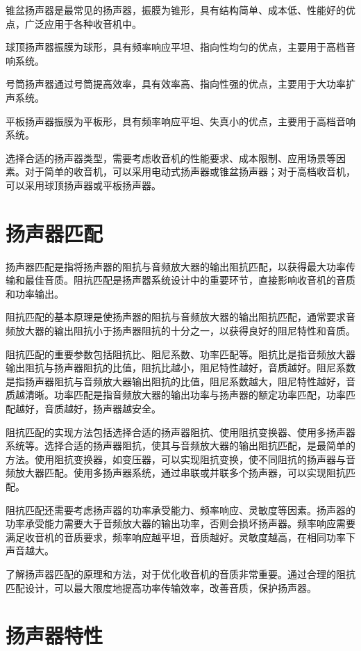 \documentclass[12pt,UTF8]{ctexbook}
\begin{document}
锥盆扬声器是最常见的扬声器，振膜为锥形，具有结构简单、成本低、性能好的优点，广泛应用于各种收音机中。

球顶扬声器振膜为球形，具有频率响应平坦、指向性均匀的优点，主要用于高档音响系统。

号筒扬声器通过号筒提高效率，具有效率高、指向性强的优点，主要用于大功率扩声系统。

平板扬声器振膜为平板形，具有频率响应平坦、失真小的优点，主要用于高档音响系统。

选择合适的扬声器类型，需要考虑收音机的性能要求、成本限制、应用场景等因素。对于简单的收音机，可以采用电动式扬声器或锥盆扬声器；对于高档收音机，可以采用球顶扬声器或平板扬声器。

\section{扬声器匹配}

扬声器匹配是指将扬声器的阻抗与音频放大器的输出阻抗匹配，以获得最大功率传输和最佳音质。阻抗匹配是扬声器系统设计中的重要环节，直接影响收音机的音质和功率输出。

阻抗匹配的基本原理是使扬声器的阻抗与音频放大器的输出阻抗匹配，通常要求音频放大器的输出阻抗小于扬声器阻抗的十分之一，以获得良好的阻尼特性和音质。

阻抗匹配的重要参数包括阻抗比、阻尼系数、功率匹配等。阻抗比是指音频放大器输出阻抗与扬声器阻抗的比值，阻抗比越小，阻尼特性越好，音质越好。阻尼系数是指扬声器阻抗与音频放大器输出阻抗的比值，阻尼系数越大，阻尼特性越好，音质越清晰。功率匹配是指音频放大器的输出功率与扬声器的额定功率匹配，功率匹配越好，音质越好，扬声器越安全。

阻抗匹配的实现方法包括选择合适的扬声器阻抗、使用阻抗变换器、使用多扬声器系统等。选择合适的扬声器阻抗，使其与音频放大器的输出阻抗匹配，是最简单的方法。使用阻抗变换器，如变压器，可以实现阻抗变换，使不同阻抗的扬声器与音频放大器匹配。使用多扬声器系统，通过串联或并联多个扬声器，可以实现阻抗匹配。

阻抗匹配还需要考虑扬声器的功率承受能力、频率响应、灵敏度等因素。扬声器的功率承受能力需要大于音频放大器的输出功率，否则会损坏扬声器。频率响应需要满足收音机的音质要求，频率响应越平坦，音质越好。灵敏度越高，在相同功率下声音越大。

了解扬声器匹配的原理和方法，对于优化收音机的音质非常重要。通过合理的阻抗匹配设计，可以最大限度地提高功率传输效率，改善音质，保护扬声器。

\section{扬声器特性}
\end{document}
